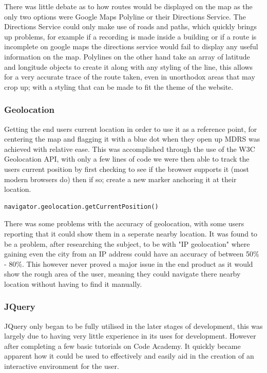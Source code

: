 \documentclass{l3proj}
\begin{document}
There was little debate as to how routes would be displayed on the map as the only two options were Google Maps Polyline or their Directions Service. The Directions Service could only make use of roads and paths, which quickly brings up problems, for example if a recording is made inside a building or if a route is incomplete on google maps the directions service would fail to display any useful information on the map. Polylines on the other hand take an array of latitude and longitude objects to create it along with any styling of the line, this allows for a very accurate trace of the route taken, even in unorthodox areas that may crop up; with a styling that can be made to fit the theme of the website.

\subsubsection{Geolocation}		Getting the end users current location in order to use it as a reference point, for centering the map and flagging it with a blue dot when they open up MDRS was achieved with relative ease. This was accomplished through the use of the \gls{W3C} Geolocation API, with only a few lines of code we were then able to track the users current position by first checking to see if the browser supports it (most modern browsers do) then if so; create a new marker anchoring it at their location.
\begin{verbatim}
navigator.geolocation.getCurrentPosition()
\end{verbatim}
There was some problems with the accuracy of geolocation, with some users reporting that it could show them in a seperate nearby location. It was found to be a problem, after researching the subject\cite{geolocation}, to be with "IP geolocation" where gaining even the city from an IP address could have an accuracy of between 50\% - 80\%. This however never proved a major issue in the end product as it would show the rough area of the user, meaning they could navigate there nearby location without having to find it manually.

\subsubsection{JQuery}		JQuery only began to be fully utilised in the later stages of development, this was largely due to having very little experience in its uses for development. However after completing a few basic tutorials on Code Academy\cite{codeacademy}. It quickly became apparent how it could be used to effectively and easily aid in the creation of an interactive environment for the user.
\end{document}
